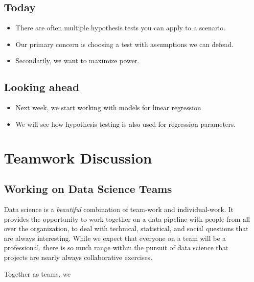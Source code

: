 \documentclass[
]{book}
\providecommand{\tightlist}{%
  \setlength{\itemsep}{0pt}\setlength{\parskip}{0pt}}
\theoremstyle{definition}
\theoremstyle{definition}
\theoremstyle{definition}
\theoremstyle{definition}
\theoremstyle{remark}
\begin{document}
\hypertarget{today}{%
\subsection{Today}\label{today}}

\begin{itemize}
\tightlist
\item
  There are often multiple hypothesis tests you can apply to a scenario.
\item
  Our primary concern is choosing a test with assumptions we can defend.
\item
  Secondarily, we want to maximize power.
\end{itemize}

\hypertarget{looking-ahead}{%
\subsection{Looking ahead}\label{looking-ahead}}

\begin{itemize}
\tightlist
\item
  Next week, we start working with models for linear regression
\item
  We will see how hypothesis testing is also used for regression parameters.
\end{itemize}

\hypertarget{teamwork-discussion}{%
\section{Teamwork Discussion}\label{teamwork-discussion}}

\hypertarget{working-on-data-science-teams}{%
\subsection{Working on Data Science Teams}\label{working-on-data-science-teams}}

Data science is a \emph{beautiful} combination of team-work and individual-work. It provides the opportunity to work together on a data pipeline with people from all over the organization, to deal with technical, statistical, and social questions that are always interesting. While we expect that everyone on a team will be a professional, there is so much range within the pursuit of data science that projects are nearly always collaborative exercises.

Together as teams, we
\end{document}
